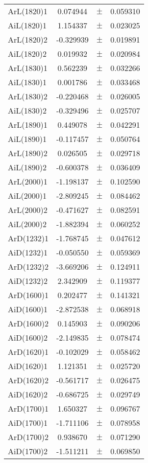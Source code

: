 \begin{table}
\begin{tiny}
\begin{tabular}{lccc}
ArL(1820)1 & 0.074944 & $\pm$ & 0.059310 \\
AiL(1820)1 & 1.154337 & $\pm$ & 0.023025 \\
ArL(1820)2 & -0.329939 & $\pm$ & 0.019891 \\
AiL(1820)2 & 0.019932 & $\pm$ & 0.020984 \\
ArL(1830)1 & 0.562239 & $\pm$ & 0.032266 \\
AiL(1830)1 & 0.001786 & $\pm$ & 0.033468 \\
ArL(1830)2 & -0.220468 & $\pm$ & 0.026005 \\
AiL(1830)2 & -0.329496 & $\pm$ & 0.025707 \\
ArL(1890)1 & 0.449078 & $\pm$ & 0.042291 \\
AiL(1890)1 & -0.117457 & $\pm$ & 0.050764 \\
ArL(1890)2 & 0.026505 & $\pm$ & 0.029718 \\
AiL(1890)2 & -0.600378 & $\pm$ & 0.036409 \\
ArL(2000)1 & -1.198137 & $\pm$ & 0.102590 \\
AiL(2000)1 & -2.809245 & $\pm$ & 0.084462 \\
ArL(2000)2 & -0.471627 & $\pm$ & 0.082591 \\
AiL(2000)2 & -1.882394 & $\pm$ & 0.060252 \\
ArD(1232)1 & -1.768745 & $\pm$ & 0.047612 \\
AiD(1232)1 & -0.050550 & $\pm$ & 0.059369 \\
ArD(1232)2 & -3.669206 & $\pm$ & 0.124911 \\
AiD(1232)2 & 2.342909 & $\pm$ & 0.119377 \\
ArD(1600)1 & 0.202477 & $\pm$ & 0.141321 \\
AiD(1600)1 & -2.872538 & $\pm$ & 0.068918 \\
ArD(1600)2 & 0.145903 & $\pm$ & 0.090206 \\
AiD(1600)2 & -2.149835 & $\pm$ & 0.078474 \\
ArD(1620)1 & -0.102029 & $\pm$ & 0.058462 \\
AiD(1620)1 & 1.121351 & $\pm$ & 0.025720 \\
ArD(1620)2 & -0.561717 & $\pm$ & 0.026475 \\
AiD(1620)2 & -0.686725 & $\pm$ & 0.029749 \\
ArD(1700)1 & 1.650327 & $\pm$ & 0.096767 \\
AiD(1700)1 & -1.711106 & $\pm$ & 0.078958 \\
ArD(1700)2 & 0.938670 & $\pm$ & 0.071290 \\
AiD(1700)2 & -1.511211 & $\pm$ & 0.069850 \\
\bottomrule
\end{tabular}
\end{tiny}
\end{table}

